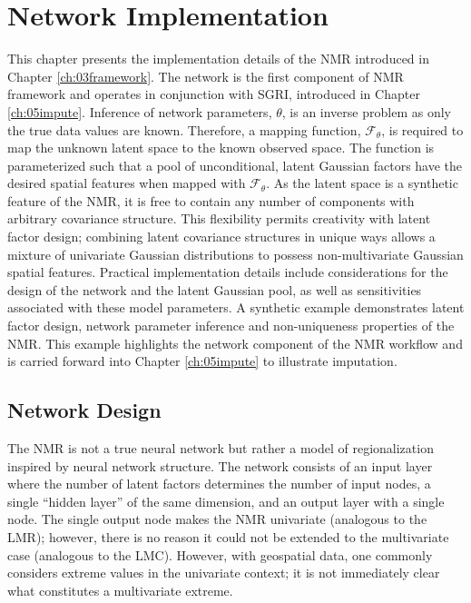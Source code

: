 
\chapter{Network Implementation}
\label{ch:04implement}

This chapter presents the implementation details of the \gls{NMR} introduced in Chapter \ref{ch:03framework}. The network is the first component of \gls{NMR} framework and operates in conjunction with \gls{SGRI}, introduced in Chapter \ref{ch:05impute}. Inference of network parameters, $\theta$, is an inverse problem as only the true data values are known. Therefore, a mapping function, $\mathcal{F}_{\theta}$, is required to map the unknown latent space to the known observed space. The function is parameterized such that a pool of unconditional, latent Gaussian factors have the desired spatial features when mapped with $\mathcal{F}_{\theta}$. As the latent space is a synthetic feature of the \gls{NMR}, it is free to contain any number of components with arbitrary covariance structure. This flexibility permits creativity with latent factor design; combining latent covariance structures in unique ways allows a mixture of univariate Gaussian distributions to possess non-multivariate Gaussian spatial features. Practical implementation details include considerations for the design of the network and the latent Gaussian pool, as well as sensitivities associated with these model parameters. A synthetic example demonstrates latent factor design, network parameter inference and non-uniqueness properties of the \gls{NMR}. This example highlights the network component of the \gls{NMR} workflow and is carried forward into Chapter \ref{ch:05impute} to illustrate imputation.

\FloatBarrier
\section{Network Design}
\label{sec:04networkd}

The \gls{NMR} is not a true neural network but rather a model of regionalization inspired by neural network structure. The network consists of an input layer where the number of latent factors determines the number of input nodes, a single ``hidden layer'' of the same dimension, and an output layer with a single node. The single output node makes the \gls{NMR} univariate (analogous to the \gls{LMR}); however, there is no reason it could not be extended to the multivariate case (analogous to the \gls{LMC}). However, with geospatial data, one commonly considers extreme values in the univariate context; it is not immediately clear what constitutes a multivariate extreme.

